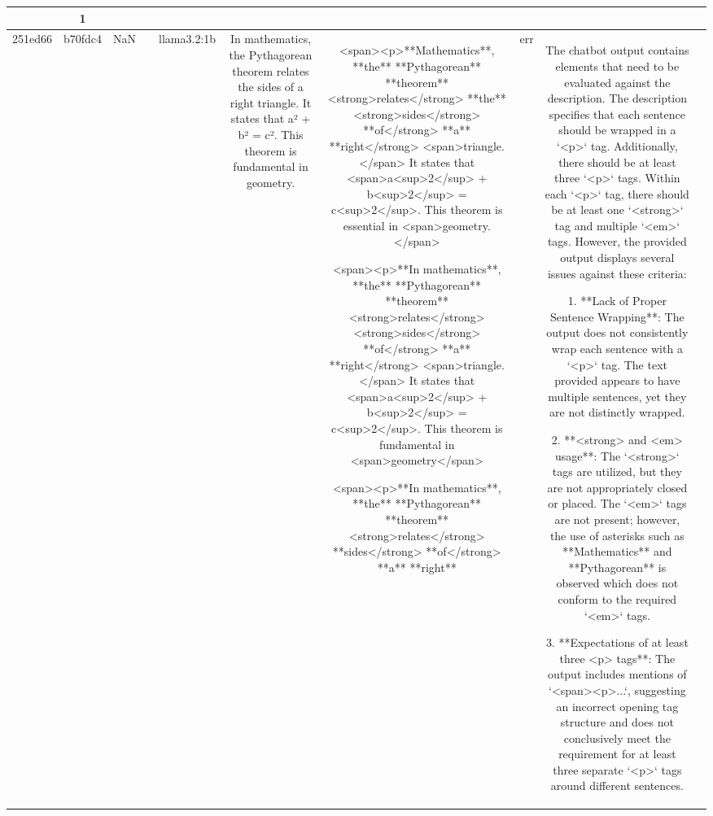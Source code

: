 \begin{table}[h!]
\begin{tabular}{|c|c|c|c|c|c|c|c|c|c|}
{{Due to the above reasons, the output does not meet the guideline of wrapping each sentence individually within `<p>` tags and properly placing `<strong>` and `<em>` tags in accordance with those `<p>` structures.  

ERR & 1\\
\hline
251ed66 & b70fdc4 & NaN &  & llama3.2:1b & In mathematics, the Pythagorean theorem relates the sides of a right triangle. It states that a² + b² = c². This theorem is fundamental in geometry. & <span><p>**Mathematics**,  **the** **Pythagorean** **theorem** <strong>relates</strong> **the** <strong>sides</strong> **of</strong>   **a**   **right</strong>   <span>triangle.</span> It states that <span>a<sup>2</sup> + b<sup>2</sup> = c<sup>2</sup>.  This theorem is essential in <span>geometry.</span>

<span><p>**In mathematics**, **the**  **Pythagorean**   **theorem** <strong>relates</strong>  <strong>sides</strong>   **of</strong>    **a**   **right</strong> <span>triangle.</span> It states that <span>a<sup>2</sup>  + b<sup>2</sup> = c<sup>2</sup>.  This theorem is fundamental in <span>geometry</span>

<span><p>**In mathematics**, **the**   **Pythagorean**    **theorem**     <strong>relates</strong>   **sides</strong>   **of</strong>      **a**   **right** & err & The chatbot output contains elements that need to be evaluated against the description. The description specifies that each sentence should be wrapped in a `<p>` tag. Additionally, there should be at least three `<p>` tags. Within each `<p>` tag, there should be at least one `<strong>` tag and multiple `<em>` tags. However, the provided output displays several issues against these criteria:

1. **Lack of Proper Sentence Wrapping**: The output does not consistently wrap each sentence with a `<p>` tag. The text provided appears to have multiple sentences, yet they are not distinctly wrapped.

2. **<strong> and <em> usage**: The `<strong>` tags are utilized, but they are not appropriately closed or placed. The `<em>` tags are not present; however, the use of asterisks such as **Mathematics** and **Pythagorean** is observed which does not conform to the required `<em>` tags. 

3. **Expectations of at least three <p> tags**: The output includes mentions of `<span><p>...`, suggesting an incorrect opening tag structure and does not conclusively meet the requirement for at least three separate `<p>` tags around different sentences.

}}
\end{tabular}
\end{table}

